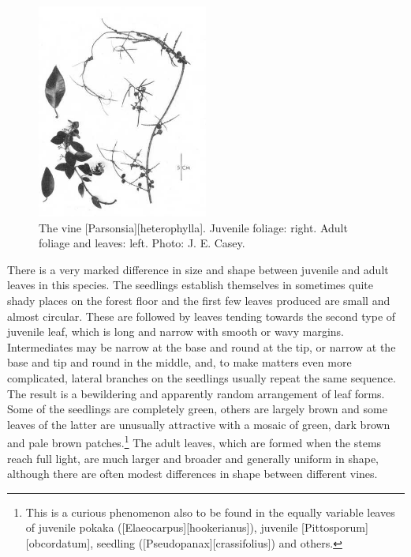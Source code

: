 \begin{figure}
	\includegraphics[width=0.5\textwidth]{graphics/figure34parsonsia.jpg}
	\centering
	\caption[The vine \emph{Parsonsia heterophylla}]{The vine [Parsonsia][heterophylla]. Juvenile foliage: right. Adult foliage and leaves: left. Photo: J. E. Casey.}%
	\label{fig:34parsonsia}
\end{figure}

There is a very marked difference in size and shape between juvenile and adult leaves in this species.
The seedlings establish themselves in sometimes quite shady places on the forest floor and the first few leaves produced are small and almost circular.
These are followed by leaves tending towards the second type of juvenile leaf, which is long and narrow with smooth or wavy margins.
Intermediates may be narrow at the base and round at the tip, or narrow at the base and tip and round in the middle, and, to make matters even more complicated, lateral branches on the seedlings usually repeat the same sequence.
The result is a bewildering and apparently random arrangement of leaf forms.
Some of the seedlings are completely green, others are largely brown and some leaves of the latter are unusually attractive with a mosaic of green, dark brown and pale brown patches.\footnote{This is a curious phenomenon also to be found in the equally variable leaves of juvenile pokaka ([Elaeocarpus][hookerianus]), juvenile [Pittosporum][obcordatum], seedling  ([Pseudopanax][crassifolius]) and others.}
The adult leaves, which are formed when the stems reach full light, are much larger and broader and generally uniform in shape, although there are often modest differences in shape between different vines.

